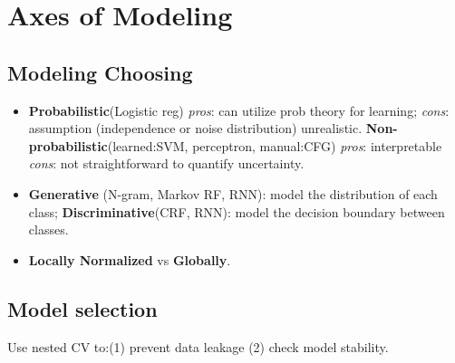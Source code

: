 \section{Axes of Modeling}

\subsection*{Modeling Choosing}

\begin{itemize}[itemsep=0pt,topsep=0pt, leftmargin=2pt, itemindent=5pt, labelwidth=5pt]
    \item \textbf{Probabilistic}(Logistic reg) \textit{pros}: can utilize prob theory for learning; \textit{cons}: assumption (independence or noise distribution) unrealistic. \textbf{Non-probabilistic}(learned:SVM, perceptron, manual:CFG) \textit{pros}: interpretable \textit{cons}: not straightforward to quantify uncertainty.
    \item \textbf{Generative} (N-gram, Markov RF, RNN): model the distribution of each class; \textbf{Discriminative}(CRF, RNN): model the decision boundary between classes.
    \item \textbf{Locally Normalized} vs \textbf{Globally}.
\end{itemize}





\subsection*{Model selection}

Use nested CV to:(1) prevent data leakage (2) check model stability.


